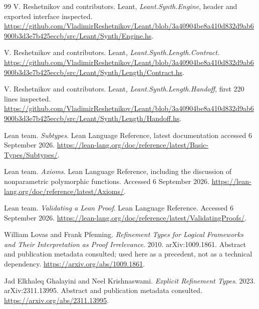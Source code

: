 \documentclass[11pt,a4paper]{article}
\theoremstyle{plain}
\theoremstyle{definition}
\theoremstyle{remark}
\begin{document}
\begin{thebibliography}{99}
 V. Reshetnikov and contributors. Leant,
\emph{Leant.Synth.Engine}, header and exported interface inspected.
\url{https://github.com/VladimirReshetnikov/Leant/blob/3a40904be8a410d832d9ab6900b3d3e7b425eccb/src/Leant/Synth/Engine.hs}.

 V. Reshetnikov and contributors. Leant,
\emph{Leant.Synth.Length.Contract}.
\url{https://github.com/VladimirReshetnikov/Leant/blob/3a40904be8a410d832d9ab6900b3d3e7b425eccb/src/Leant/Synth/Length/Contract.hs}.

 V. Reshetnikov and contributors. Leant,
\emph{Leant.Synth.Length.Handoff}, first 220 lines inspected.
\url{https://github.com/VladimirReshetnikov/Leant/blob/3a40904be8a410d832d9ab6900b3d3e7b425eccb/src/Leant/Synth/Length/Handoff.hs}.

 Lean team. \emph{Subtypes}. Lean Language Reference,
latest documentation accessed 6 September 2026.
\url{https://lean-lang.org/doc/reference/latest/Basic-Types/Subtypes/}.

 Lean team. \emph{Axioms}. Lean Language Reference,
including the discussion of nonparametric polymorphic functions. Accessed
6 September 2026.
\url{https://lean-lang.org/doc/reference/latest/Axioms/}.

 Lean team. \emph{Validating a Lean Proof}. Lean
Language Reference. Accessed 6 September 2026.
\url{https://lean-lang.org/doc/reference/latest/ValidatingProofs/}.

 William Lovas and Frank Pfenning.
\emph{Refinement Types for Logical Frameworks and Their Interpretation as
Proof Irrelevance}. 2010. arXiv:1009.1861. Abstract and publication metadata
consulted; used here as a precedent, not as a technical dependency.
\url{https://arxiv.org/abs/1009.1861}.

 Jad Elkhaleq Ghalayini and Neel Krishnaswami.
\emph{Explicit Refinement Types}. 2023. arXiv:2311.13995. Abstract and
publication metadata consulted.
\url{https://arxiv.org/abs/2311.13995}.
\end{thebibliography}
\end{document}
